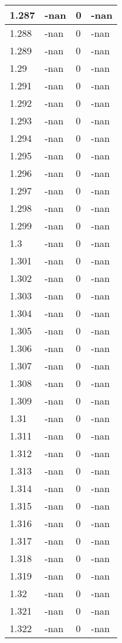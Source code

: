 \documentclass[a4paper,14pt]{extarticle}
\begin{document}
\begin{longtable}{||m{3cm}||m{3cm}|m{3cm}||m{3cm}||}
\hline
1.287 & -nan & 0 & -nan\\
\hline
1.288 & -nan & 0 & -nan\\
\hline
1.289 & -nan & 0 & -nan\\
\hline
1.29 & -nan & 0 & -nan\\
\hline
1.291 & -nan & 0 & -nan\\
\hline
1.292 & -nan & 0 & -nan\\
\hline
1.293 & -nan & 0 & -nan\\
\hline
1.294 & -nan & 0 & -nan\\
\hline
1.295 & -nan & 0 & -nan\\
\hline
1.296 & -nan & 0 & -nan\\
\hline
1.297 & -nan & 0 & -nan\\
\hline
1.298 & -nan & 0 & -nan\\
\hline
1.299 & -nan & 0 & -nan\\
\hline
1.3 & -nan & 0 & -nan\\
\hline
1.301 & -nan & 0 & -nan\\
\hline
1.302 & -nan & 0 & -nan\\
\hline
1.303 & -nan & 0 & -nan\\
\hline
1.304 & -nan & 0 & -nan\\
\hline
1.305 & -nan & 0 & -nan\\
\hline
1.306 & -nan & 0 & -nan\\
\hline
1.307 & -nan & 0 & -nan\\
\hline
1.308 & -nan & 0 & -nan\\
\hline
1.309 & -nan & 0 & -nan\\
\hline
1.31 & -nan & 0 & -nan\\
\hline
1.311 & -nan & 0 & -nan\\
\hline
1.312 & -nan & 0 & -nan\\
\hline
1.313 & -nan & 0 & -nan\\
\hline
1.314 & -nan & 0 & -nan\\
\hline
1.315 & -nan & 0 & -nan\\
\hline
1.316 & -nan & 0 & -nan\\
\hline
1.317 & -nan & 0 & -nan\\
\hline
1.318 & -nan & 0 & -nan\\
\hline
1.319 & -nan & 0 & -nan\\
\hline
1.32 & -nan & 0 & -nan\\
\hline
1.321 & -nan & 0 & -nan\\
\hline
1.322 & -nan & 0 & -nan\\

\end{longtable}
\end{document}
